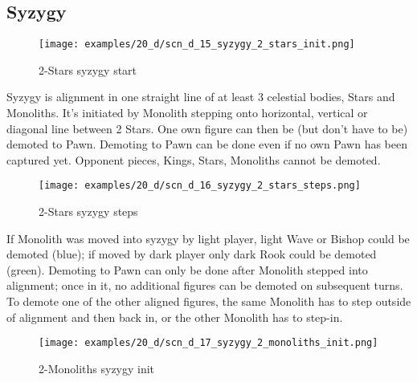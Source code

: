 \subsection*{Syzygy}

\vspace*{-1.2\baselineskip}
\noindent
\begin{figure}[!h]
\texttt{[image: examples/20\_d/scn\_d\_15\_syzygy\_2\_stars\_init.png]}
\caption{2-Stars syzygy start}
\label{fig:scn_d_15_syzygy_2_stars_init}
\end{figure}

Syzygy is alignment in one straight line of at least 3 celestial bodies, Stars and Monoliths. It's initiated by
Monolith stepping onto horizontal, vertical or diagonal line between 2 Stars. One own figure can then be (but
don't have to be) demoted to Pawn. Demoting to Pawn can be done even if no own Pawn has been captured yet.
Opponent pieces, Kings, Stars, Monoliths cannot be demoted.

\clearpage %

\noindent
\begin{figure}[!h]
\texttt{[image: examples/20\_d/scn\_d\_16\_syzygy\_2\_stars\_steps.png]}
\caption{2-Stars syzygy steps}
\label{fig:scn_d_16_syzygy_2_stars_steps}
\end{figure}

If Monolith was moved into syzygy by light player, light Wave or Bishop could be demoted (blue); if moved by dark
player only dark Rook could be demoted (green). Demoting to Pawn can only be done after Monolith stepped into
alignment; once in it, no additional figures can be demoted on subsequent turns. To demote one of the other aligned
figures, the same Monolith has to step outside of alignment and then back in, or the other Monolith has to step-in.

\clearpage %

\noindent
\begin{figure}[!h]
\texttt{[image: examples/20\_d/scn\_d\_17\_syzygy\_2\_monoliths\_init.png]}
\caption{2-Monoliths syzygy init}
\label{fig:scn_d_17_syzygy_2_monoliths_init}
\end{figure}

